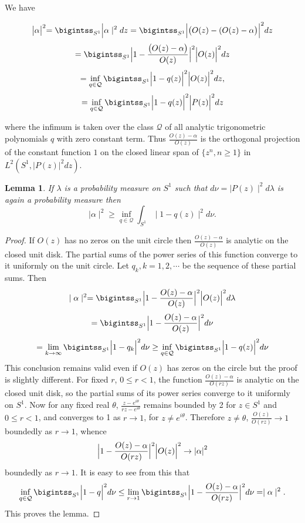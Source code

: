 \documentclass{amsart}
\newtheorem{lem}[Th]{Lemma}
\theoremstyle{definition}
\theoremstyle{remark}
\numberwithin{equation}{section}
\newcommand{\ds}{\displaystyle}
\newcommand{\1}{\mathbb{1}}
\begin{document}
We have

$$\bigr| \alpha\bigl|^2 = \bigintss_{S^1}\Bigl|\alpha\mid^2dz = \bigintss_{S^1}\Bigl| \bigl(O(z) -(O(z) -\alpha\bigr)\Bigr|^2dz$$
$$= \bigintss_{S^1}\Bigl| 1 - \frac{\bigl(O(z) - \alpha\bigr)}{O(z)}\Bigr|^2 \Bigl| O(z)\Bigr|^2dz$$
$$= \inf_{q\in{\mathcal Q}} \bigintss_{S^1}\Bigl| 1 - q(z)\Bigr|^2 \Bigl| O(z)\Bigr|^2dz,$$
$$= \inf_{q\in{\mathcal Q}} \bigintss_{S^1}\Bigl| 1 - q(z)\Bigr|^2 \Bigl| P(z)\Bigr|^2dz$$

where the infimum is taken over the class $\mathcal Q$ of all analytic trigonometric polynomials $q$ with zero constant term.
Thus $\frac{O(z) - \alpha}{O(z)}$ is the orthogonal projection of the constant function $1$ on the closed linear span of $\{z^n, n \geq 1\}$ in $L^2(S^1,| P(z)|^2dz)$.\\

\begin{lem}\label{lem1}
 If $\lambda$ is a probability measure on $S^1$ such that $d\nu=\mid P(z)\mid^2d\lambda$ is again a probability measure then
$$\mid \alpha \mid^2 \geq \inf_{q \in {\mathcal{Q}}}\int_{S^1}\mid 1-q(z)\mid^2d\nu.$$
\end{lem}
\begin{proof}
If $O(z)$ has no zeros on the unit circle then $\ds \frac{O(z) - \alpha}{O(z)}$ is analytic on the closed unit disk. The partial sums of the power series of this function converge to it uniformly on the unit circle. Let $q_k, k = 1,2,\cdots$ be the sequence of these partial sums.
Then
$$\mid\alpha\mid^2 = \bigintss_{S^1}\Bigl| 1 - \frac{O(z) -\alpha}{O(z)}\Bigr|^2\Bigl| O(z)\Bigr|^2d\lambda$$
$$ = \bigintss_{S^1}\Bigl|1 - \frac{O(z) -\alpha}{O(z)}\Bigr|^2d\nu$$
$$=\lim_{k\rightarrow \infty}\bigintss_{S^1}\Bigl| 1 - q_k\Bigr|^2d\nu \geq \inf_{q\in {\mathcal Q}}\bigintss_{S^1}\Bigl| 1 - q(z)\Bigr|^2d\nu$$
This conclusion remains valid even if $O(z)$ has zeros on the circle but the proof is slightly different. For fixed
$r$, $0 \leq r < 1$, the function $\frac{O(z) -\alpha}{O(rz)}$ is analytic on the closed unit disk, so the partial sums of its power series  converge to it uniformly on $S^1$. Now for any fixed real $\theta$,  $\ds \frac{z-e^{i\theta}}{rz - e^{i\theta}}$ remains bounded by 2 for $z\in S^1$
and $0\leq r <1$, and converges to 1 as $r\rightarrow 1$, for $z \neq e^{i\theta}$. Therefore $z\neq \theta$,
$\ds \frac{O(z)}{O(rz)} \rightarrow 1$ boundedly as $r\rightarrow 1$, whence
$$\Bigl| 1 - \frac{O(z) -\alpha}{O(rz)}\Bigr|^2\Bigl|O(z)\Bigr|^2 \rightarrow \left|\alpha\right|^2 $$ boundedly as $r\rightarrow 1$. It is easy to see from this that
$$\inf_{q\in  {\mathcal Q}}\bigintss_{S^1}\Bigl| 1 - q\Bigr|^2d\nu \leq \lim_{r\rightarrow 1}\bigintss_{S^1}\Bigl| 1 - \frac{O(z) - \alpha}{O(rz)}\Bigr|^2 d\nu = \mid \alpha\mid^2.$$
This proves the lemma.
\end{proof}
\end{document}
